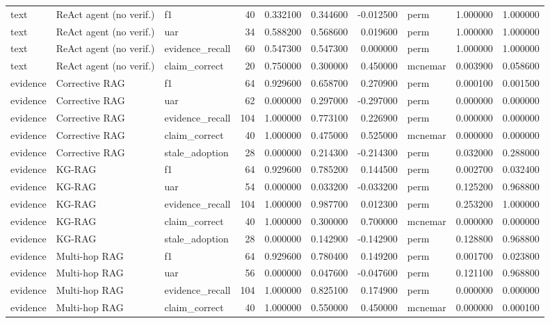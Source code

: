 \begin{table}
\begin{tabular}{lllrrrrlrr}
text & ReAct agent (no verif.) & f1 & 40 & 0.332100 & 0.344600 & -0.012500 & perm & 1.000000 & 1.000000 \\
text & ReAct agent (no verif.) & uar & 34 & 0.588200 & 0.568600 & 0.019600 & perm & 1.000000 & 1.000000 \\
text & ReAct agent (no verif.) & evidence\_recall & 60 & 0.547300 & 0.547300 & 0.000000 & perm & 1.000000 & 1.000000 \\
text & ReAct agent (no verif.) & claim\_correct & 20 & 0.750000 & 0.300000 & 0.450000 & mcnemar & 0.003900 & 0.058600 \\
evidence & Corrective RAG & f1 & 64 & 0.929600 & 0.658700 & 0.270900 & perm & 0.000100 & 0.001500 \\
evidence & Corrective RAG & uar & 62 & 0.000000 & 0.297000 & -0.297000 & perm & 0.000000 & 0.000000 \\
evidence & Corrective RAG & evidence\_recall & 104 & 1.000000 & 0.773100 & 0.226900 & perm & 0.000000 & 0.000000 \\
evidence & Corrective RAG & claim\_correct & 40 & 1.000000 & 0.475000 & 0.525000 & mcnemar & 0.000000 & 0.000000 \\
evidence & Corrective RAG & stale\_adoption & 28 & 0.000000 & 0.214300 & -0.214300 & perm & 0.032000 & 0.288000 \\
evidence & KG-RAG & f1 & 64 & 0.929600 & 0.785200 & 0.144500 & perm & 0.002700 & 0.032400 \\
evidence & KG-RAG & uar & 54 & 0.000000 & 0.033200 & -0.033200 & perm & 0.125200 & 0.968800 \\
evidence & KG-RAG & evidence\_recall & 104 & 1.000000 & 0.987700 & 0.012300 & perm & 0.253200 & 1.000000 \\
evidence & KG-RAG & claim\_correct & 40 & 1.000000 & 0.300000 & 0.700000 & mcnemar & 0.000000 & 0.000000 \\
evidence & KG-RAG & stale\_adoption & 28 & 0.000000 & 0.142900 & -0.142900 & perm & 0.128800 & 0.968800 \\
evidence & Multi-hop RAG & f1 & 64 & 0.929600 & 0.780400 & 0.149200 & perm & 0.001700 & 0.023800 \\
evidence & Multi-hop RAG & uar & 56 & 0.000000 & 0.047600 & -0.047600 & perm & 0.121100 & 0.968800 \\
evidence & Multi-hop RAG & evidence\_recall & 104 & 1.000000 & 0.825100 & 0.174900 & perm & 0.000000 & 0.000000 \\
evidence & Multi-hop RAG & claim\_correct & 40 & 1.000000 & 0.550000 & 0.450000 & mcnemar & 0.000000 & 0.000100 \\

\end{tabular}
\end{table}

